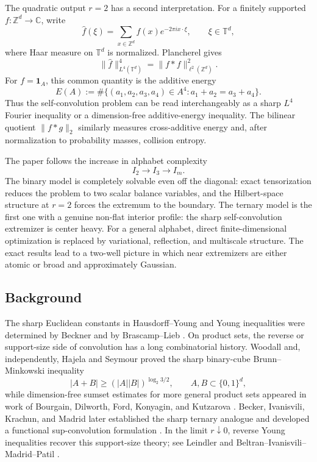 \documentclass[11pt,reqno]{amsart}
\numberwithin{equation}{section}
\theoremstyle{definition}
\theoremstyle{remark}
\newcommand{\Z}{\mathbb Z}
\newcommand{\T}{\mathbb T}
\newcommand{\C}{\mathbb C}
\newcommand{\one}{\mathbf 1}
\begin{document}
The quadratic output $r=2$ has a second interpretation.  For a finitely supported $f\colon\Z^d\to\C$, write
\[
  \widehat f(\xi)=\sum_{x\in\Z^d}f(x)e^{-2\pi i x\cdot\xi},
  \qquad \xi\in\T^d,
\]
where Haar measure on $\T^d$ is normalized.  Plancherel gives
\begin{equation}\label{eq:intro-fourier}
  \|\widehat f\|_{L^4(\T^d)}^4
  =\|f*f\|_{\ell^2(\Z^d)}^2.
\end{equation}
For $f=\one_A$, this common quantity is the additive energy
\begin{equation}\label{eq:intro-additive-energy}
  E(A)
  :=\#\{(a_1,a_2,a_3,a_4)\in A^4:
           a_1+a_2=a_3+a_4\}.
\end{equation}
Thus the self-convolution problem can be read interchangeably as a sharp $L^4$ Fourier inequality or a dimension-free additive-energy inequality.  The bilinear quotient $\|f*g\|_2$ similarly measures cross-additive energy and, after normalization to probability masses, collision entropy.

The paper follows the increase in alphabet complexity
\[
  I_2\longrightarrow I_3\longrightarrow I_m.
\]
The binary model is completely solvable even off the diagonal: exact tensorization reduces the problem to two scalar balance variables, and the Hilbert-space structure at $r=2$ forces the extremum to the boundary.  The ternary model is the first one with a genuine non-flat interior profile: the sharp self-convolution extremizer is center heavy.  For a general alphabet, direct finite-dimensional optimization is replaced by variational, reflection, and multiscale structure.  The exact results lead to a two-well picture in which near extremizers are either atomic or broad and approximately Gaussian.

\subsection{Background}
The sharp Euclidean constants in Hausdorff--Young and Young inequalities were determined by Beckner and by Brascamp--Lieb \cite{Beckner1975,BrascampLieb1976}.  On product sets, the reverse or support-size side of convolution has a long combinatorial history.  Woodall and, independently, Hajela and Seymour proved the sharp binary-cube Brunn--Minkowski inequality
\[
  |A+B|\ge (|A||B|)^{\log_2 3/2},
  \qquad A,B\subset\{0,1\}^d,
\]
while dimension-free sumset estimates for more general product sets appeared in work of Bourgain, Dilworth, Ford, Konyagin, and Kutzarova \cite{Woodall1977,HajelaSeymour1985,BourgainEtAl2011}.  Becker, Ivanisvili, Krachun, and Madrid later established the sharp ternary analogue and developed a functional sup-convolution formulation \cite{BeckerIKM2024}.  In the limit $r\downarrow0$, reverse Young inequalities recover this support-size theory; see Leindler and Beltran--Ivanisvili--Madrid--Patil \cite{Leindler1972,BIMP}.
\end{document}
